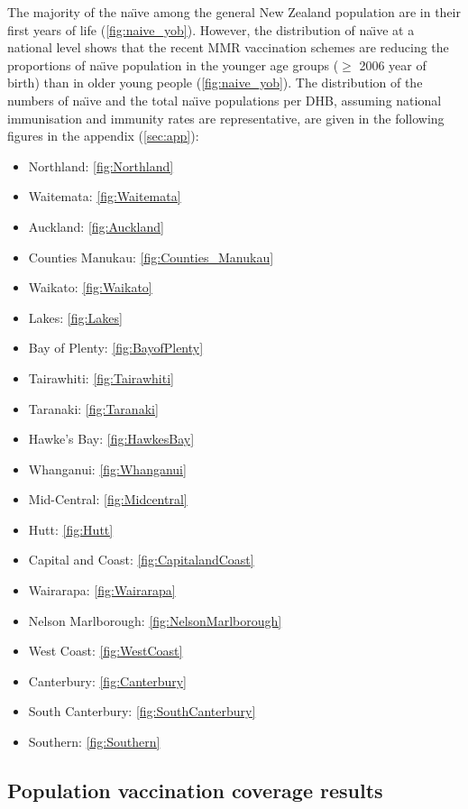 \documentclass{article}
\begin{document}
The majority of the na\"{\i}ve among the general New Zealand population are in their first years of life (\autoref{fig:naive_yob}). However, the distribution of na\"{\i}ve at a national level shows that the recent MMR vaccination schemes are reducing the proportions of na\"{\i}ve population in the younger age groups ($\geq$ 2006 year of birth) than in older young people  (\autoref{fig:naive_yob}). The distribution of the numbers of na\"{\i}ve and the total na\"{\i}ve populations per DHB, assuming national immunisation and immunity rates are representative, are given in the following figures in the appendix (\autoref{sec:app}): 
\begin{itemize}[noitemsep,nolistsep]
\item Northland: \autoref{fig:Northland}
\item Waitemata: \autoref{fig:Waitemata}
\item Auckland: \autoref{fig:Auckland}
\item Counties Manukau: \autoref{fig:Counties_Manukau}
\item Waikato: \autoref{fig:Waikato}
\item Lakes: \autoref{fig:Lakes}
\item Bay of Plenty: \autoref{fig:BayofPlenty}
\item Tairawhiti: \autoref{fig:Tairawhiti}
\item Taranaki: \autoref{fig:Taranaki}
\item Hawke's Bay: \autoref{fig:HawkesBay}
\item Whanganui: \autoref{fig:Whanganui}
\item Mid-Central: \autoref{fig:Midcentral}
\item Hutt: \autoref{fig:Hutt}
\item Capital and Coast: \autoref{fig:CapitalandCoast}
\item Wairarapa: \autoref{fig:Wairarapa}
\item Nelson Marlborough: \autoref{fig:NelsonMarlborough}
\item West Coast: \autoref{fig:WestCoast}
\item Canterbury: \autoref{fig:Canterbury}
\item South Canterbury: \autoref{fig:SouthCanterbury}
\item Southern: \autoref{fig:Southern}
\end{itemize}

\subsection{Population vaccination coverage results}
\label{sub:popvac}
\end{document}
